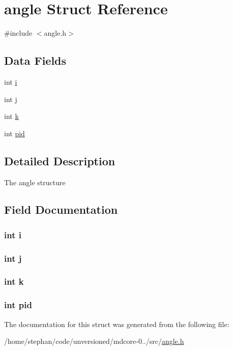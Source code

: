 \hypertarget{structangle}{\section{angle Struct Reference}
\label{structangle}
}


{\ttfamily \#include $<$angle.\-h$>$}

\subsection*{Data Fields}
\begin{DoxyCompactItemize}
\item 
int \hyperlink{structangle_acb559820d9ca11295b4500f179ef6392}{i}
\item 
int \hyperlink{structangle_a37d972ae0b47b9099e30983131d31916}{j}
\item 
int \hyperlink{structangle_ab66ed8e0098c0a86b458672a55a9cca9}{k}
\item 
int \hyperlink{structangle_af500917c052066b40cf47f96b43c607b}{pid}
\end{DoxyCompactItemize}


\subsection{Detailed Description}
The angle structure 

\subsection{Field Documentation}
\hypertarget{structangle_acb559820d9ca11295b4500f179ef6392}{
\subsubsection[{i}]{\setlength{\rightskip}{0pt plus 5cm}int i}}\label{structangle_acb559820d9ca11295b4500f179ef6392}
\hypertarget{structangle_a37d972ae0b47b9099e30983131d31916}{
\subsubsection[{j}]{\setlength{\rightskip}{0pt plus 5cm}int j}}\label{structangle_a37d972ae0b47b9099e30983131d31916}
\hypertarget{structangle_ab66ed8e0098c0a86b458672a55a9cca9}{
\subsubsection[{k}]{\setlength{\rightskip}{0pt plus 5cm}int k}}\label{structangle_ab66ed8e0098c0a86b458672a55a9cca9}
\hypertarget{structangle_af500917c052066b40cf47f96b43c607b}{
\subsubsection[{pid}]{\setlength{\rightskip}{0pt plus 5cm}int pid}}\label{structangle_af500917c052066b40cf47f96b43c607b}


The documentation for this struct was generated from the following file\-:\begin{DoxyCompactItemize}
\item 
/home/stephan/code/unversioned/mdcore-\/0../src/\hyperlink{angle_8h}{angle.\-h}\end{DoxyCompactItemize}
